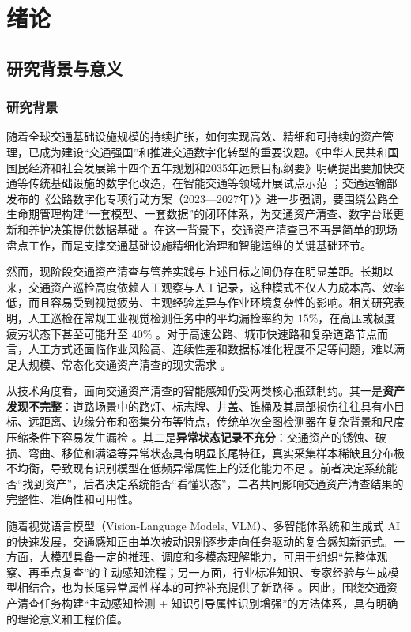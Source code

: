 ﻿\chapter{绪论}

\section{研究背景与意义}
\subsection{研究背景}
随着全球交通基础设施规模的持续扩张，如何实现高效、精细和可持续的资产管理，已成为建设“交通强国”和推进交通数字化转型的重要议题。《中华人民共和国国民经济和社会发展第十四个五年规划和2035年远景目标纲要》明确提出要加快交通等传统基础设施的数字化改造，在智能交通等领域开展试点示范 \cite{china2021plan}；交通运输部发布的《公路数字化专项行动方案（2023—2027年）》进一步强调，要围绕公路全生命期管理构建“一套模型、一套数据”的闭环体系，为交通资产清查、数字台账更新和养护决策提供数据基础 \cite{mot2023highway}。在这一背景下，交通资产清查已不再是简单的现场盘点工作，而是支撑交通基础设施精细化治理和智能运维的关键基础环节。

然而，现阶段交通资产清查与管养实践与上述目标之间仍存在明显差距。长期以来，交通资产巡检高度依赖人工观察与人工记录，这种模式不仅人力成本高、效率低，而且容易受到视觉疲劳、主观经验差异与作业环境复杂性的影响。相关研究表明，人工巡检在常规工业视觉检测任务中的平均漏检率约为 $15\%$，在高压或极度疲劳状态下甚至可能升至 $40\%$ \cite{naqviquality}。对于高速公路、城市快速路和复杂道路节点而言，人工方式还面临作业风险高、连续性差和数据标准化程度不足等问题，难以满足大规模、常态化交通资产清查的现实需求 \cite{roadvision_ai}。

从技术角度看，面向交通资产清查的智能感知仍受两类核心瓶颈制约。其一是\textbf{资产发现不完整}：道路场景中的路灯、标志牌、井盖、锥桶及其局部损伤往往具有小目标、远距离、边缘分布和密集分布等特点，传统单次全图检测器在复杂背景和尺度压缩条件下容易发生漏检 \cite{small_object2024}。其二是\textbf{异常状态记录不充分}：交通资产的锈蚀、破损、弯曲、移位和满溢等异常状态具有明显长尾特征，真实采集样本稀缺且分布极不均衡，导致现有识别模型在低频异常属性上的泛化能力不足 \cite{longtail_driving2024}。前者决定系统能否“找到资产”，后者决定系统能否“看懂状态”，二者共同影响交通资产清查结果的完整性、准确性和可用性。

随着视觉语言模型（Vision-Language Models, VLM）、多智能体系统和生成式 AI 的快速发展，交通感知正由单次被动识别逐步走向任务驱动的复合感知新范式。一方面，大模型具备一定的推理、调度和多模态理解能力，可用于组织“先整体观察、再重点复查”的主动感知流程；另一方面，行业标准知识、专家经验与生成模型相结合，也为长尾异常属性样本的可控补充提供了新路径 \cite{highway_scene2025}。因此，围绕交通资产清查任务构建“主动感知检测 + 知识引导属性识别增强”的方法体系，具有明确的理论意义和工程价值。

